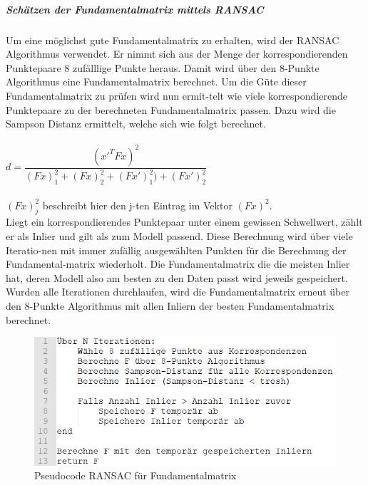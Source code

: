 \subparagraph{Schätzen der Fundamentalmatrix mittels RANSAC}
Um eine möglichst gute Fundamentalmatrix zu erhalten, wird der RANSAC Algorithmus verwendet. Er nimmt sich aus der Menge der korrespondierenden Punktepaare 8 zufälllige Punkte heraus. Damit wird über den 8-Punkte Algorithmus eine Fundamentalmatrix berechnet. Um die Güte dieser Fundamentalmatrix zu prüfen wird nun ermit-telt wie viele korrespondierende Punktepaare zu der berechneten Fundamentalmatrix passen. Dazu wird die Sampson Distanz ermittelt, welche sich wie folgt berechnet.
\\
\\
$d =  \dfrac{(x'^TFx)^2}{(Fx)^2_1 + (Fx)^2_2 + (Fx')^2_1) + (Fx')^2_2}$
\\
\\
$(Fx)^2_j$ beschreibt hier den j-ten Eintrag im Vektor $(Fx)^2$.
\\
Liegt ein korrespondierendes Punktepaar unter einem gewissen Schwellwert, zählt er als Inlier und gilt als zum Modell passend. Diese Berechnung wird über viele Iteratio-nen mit immer zufällig ausgewählten Punkten für die Berechnung der Fundamental-matrix wiederholt. Die Fundamentalmatrix die die meisten Inlier hat, deren Modell also am besten zu den Daten passt wird jeweils gespeichert. Wurden alle Iterationen durchlaufen, wird die Fundamentalmatrix erneut über den 8-Punkte Algorithmus mit allen Inliern der besten Fundamentalmatrix berechnet. \cite{Richard2000} \cite{Mathworksb}

\begin{figure}[ht]
    \centering
    \includegraphics[scale=0.75]{Figures/PseudocodeRansac.PNG}
    \caption{Pseudocode RANSAC für Fundamentalmatrix}
\end{figure}

